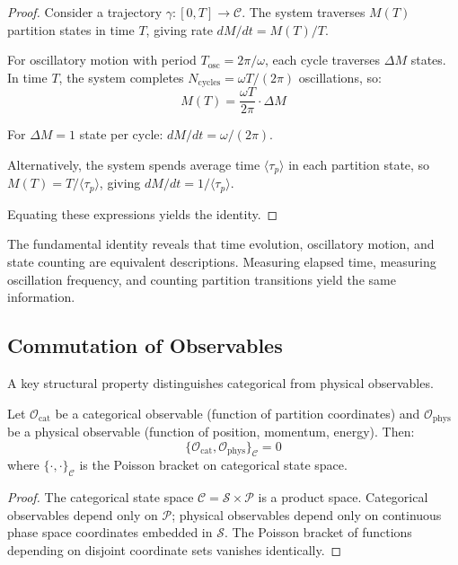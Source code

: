 \begin{proof}
Consider a trajectory $\gamma: [0, T] \to \mathcal{C}$. The system traverses $M(T)$ partition states in time $T$, giving rate $dM/dt = M(T)/T$.

For oscillatory motion with period $T_{\mathrm{osc}} = 2\pi/\omega$, each cycle traverses $\Delta M$ states. In time $T$, the system completes $N_{\mathrm{cycles}} = \omega T/(2\pi)$ oscillations, so:
\begin{equation}
    M(T) = \frac{\omega T}{2\pi} \cdot \Delta M
\end{equation}

For $\Delta M = 1$ state per cycle: $dM/dt = \omega/(2\pi)$.

Alternatively, the system spends average time $\langle\tau_p\rangle$ in each partition state, so $M(T) = T/\langle\tau_p\rangle$, giving $dM/dt = 1/\langle\tau_p\rangle$.

Equating these expressions yields the identity.
\end{proof}

\begin{remark}
The fundamental identity reveals that time evolution, oscillatory motion, and state counting are equivalent descriptions. Measuring elapsed time, measuring oscillation frequency, and counting partition transitions yield the same information.
\end{remark}

\subsection{Commutation of Observables}

A key structural property distinguishes categorical from physical observables.

\begin{theorem}
\label{thm:commutation}
Let $\mathcal{O}_{\mathrm{cat}}$ be a categorical observable (function of partition coordinates) and $\mathcal{O}_{\mathrm{phys}}$ be a physical observable (function of position, momentum, energy). Then:
\begin{equation}
    \{\mathcal{O}_{\mathrm{cat}}, \mathcal{O}_{\mathrm{phys}}\}_{\mathcal{C}} = 0
\end{equation}
where $\{\cdot, \cdot\}_{\mathcal{C}}$ is the Poisson bracket on categorical state space.
\end{theorem}

\begin{proof}
The categorical state space $\mathcal{C} = \mathcal{S} \times \mathcal{P}$ is a product space. Categorical observables depend only on $\mathcal{P}$; physical observables depend only on continuous phase space coordinates embedded in $\mathcal{S}$. The Poisson bracket of functions depending on disjoint coordinate sets vanishes identically.
\end{proof}

